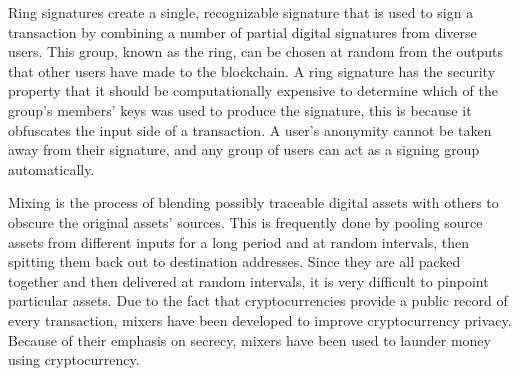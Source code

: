 \documentclass[conference]{IEEEtran}
\begin{document}

Ring signatures create a single, recognizable signature that is used to sign
a transaction by combining a number of partial digital signatures from diverse
users. This group, known as the ring, can be chosen at random from the outputs
that other users have made to the blockchain. A ring signature has the security
property that it should be computationally expensive to determine which
of the group's members' keys was used to produce the signature, this is because
it obfuscates the input side of a transaction. A user's anonymity cannot
be taken away from their signature, and any group of users can act as a signing
group automatically.


Mixing is the process of blending possibly traceable digital assets
with others to obscure the original assets' sources. This is frequently done
by pooling source assets from different inputs for a long period and at random
intervals, then spitting them back out to destination addresses. Since they
are all packed together and then delivered at random intervals, it is very
difficult to pinpoint particular assets. Due to the fact that cryptocurrencies
provide a public record of every transaction, mixers have been developed
to improve cryptocurrency privacy. Because of their emphasis on secrecy,
mixers have been used to launder money using cryptocurrency.
\end{document}
